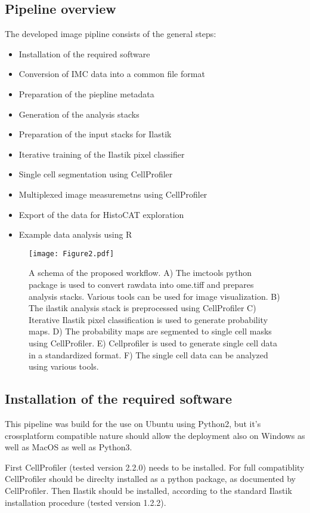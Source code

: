 \documentclass[a4paper]{article}
\begin{document}
\subsection{Pipeline overview}
The developed image pipline consists of the general steps:
\begin{itemize}
\item Installation of the required software
\item Conversion of IMC data into a common file format
\item Preparation of the piepline metadata
\item Generation of the analysis stacks 
\item Preparation of the input stacks for Ilastik
\item Iterative training of the Ilastik pixel classifier
\item Single cell segmentation using CellProfiler
\item Multiplexed image measuremetns using CellProfiler
\item Export of the data for HistoCAT exploration
\item Example data analysis using R
\end{itemize}

\begin{figure}[htb]
\centering
\texttt{[image: Figure2.pdf]}
\caption{
A schema of the proposed workflow. A) The imctools python package is
used to convert rawdata into ome.tiff and prepares analysis stacks. Various tools can be used for
image visualization. B) The ilastik analysis stack is preprocessed using CellProfiler C) Iterative Ilastik pixel classification is
used to generate probability maps. D) The probability maps are segmented to single cell masks using
CellProfiler. E) Cellprofiler is used to generate single cell data in a standardized format. F) The
single cell data can be analyzed using various tools.
\label{fig:pipeline}
}
\end{figure}

\subsection{Installation of the required software}
This pipeline was build for the use on Ubuntu using Python2, but it's crossplatform compatible nature should
allow the deployment also on Windows as well as MacOS as well as Python3.

First CellProfiler (tested version 2.2.0)  needs to be installed. For full compatiblity CellProfiler should be direclty
installed as a python package, as documented by CellProfiler. Then Ilastik should be installed,
according to the standard Ilastik installation procedure (tested version 1.2.2).
\end{document}
